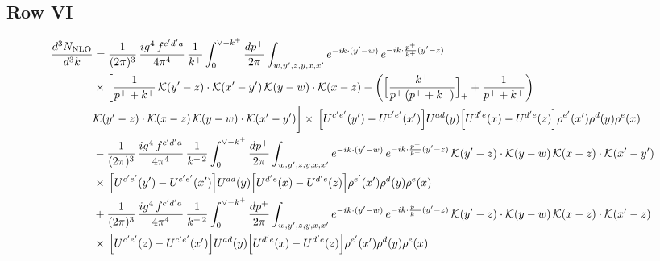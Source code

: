\documentclass[9pt]{article}
\numberwithin{equation}{section}
\begin{document}
\subsection{Row VI}
\begin{align}
\frac{d^{3}N_{\rm NLO}}{d^{3}k}&=\frac{1}{(2\pi)^{3}}\,\frac{ig^{4}\,f^{c^{\prime}d^{\prime}a}}{4\pi^{4}}\,\frac{1}{k^{+}}\int_{0}^{\vee-k^{+}}\frac{dp^{+}}{2\pi}\int_{w,y^{\prime},z,y,x,x^{\prime}}e^{-ik\cdot(y^{\prime}-w)}\,e^{-ik\cdot\frac{p^{+}}{k^{+}}(y^{\prime}-z)}\notag\\&\times\bigg[\frac{1}{p^{+}+k^{+}}\,\mathcal{K}(y^{\prime}-z)\cdot\mathcal{K}(x^{\prime}-y^{\prime})\,\mathcal{K}(y-w)\cdot\mathcal{K}(x-z)-\bigg(\Big[\frac{k^{+}}{p^{+}\,(p^{+}+k^{+})}\Big]_{+}+\frac{1}{p^{+}+k^{+}}\bigg)\notag \\ & \mathcal{K}(y^{\prime}-z)\cdot\mathcal{K}(x-z)\,\mathcal{K}(y-w)\cdot\mathcal{K}(x^{\prime}-y^{\prime})\bigg]\times\,\Big[U^{c^{\prime}e^{\prime}}(y^{\prime})-U^{c^{\prime}e^{\prime}}(x^{\prime})\Big]U^{ad}(y)\Big[U^{d^{\prime}e}(x)-U^{d^{\prime}e}(z)\Big]\rho^{e^{\prime}}(x^{\prime})\rho^{d}(y)\rho^{e}(x)\notag\\&-\frac{1}{(2\pi)^{3}}\,\frac{ig^{4}\,f^{c^{\prime}d^{\prime}a}}{4\pi^{4}}\,\frac{1}{k^{+\,2}}\int_{0}^{\vee-k^{+}}\frac{dp^{+}}{2\pi}\int_{w,y^{\prime},z,y,x,x^{\prime}}e^{-ik\cdot(y^{\prime}-w)}\,e^{-ik\cdot\frac{p^{+}}{k^{+}}(y^{\prime}-z)}\,\mathcal{K}(y^{\prime}-z)\cdot\mathcal{K}(y-w)\,\mathcal{K}(x-z)\cdot\mathcal{K}(x^{\prime}-y^{\prime})\notag\\&\times\,\Big[U^{c^{\prime}e^{\prime}}(y^{\prime})-U^{c^{\prime}e^{\prime}}(x^{\prime})\Big]U^{ad}(y)\Big[U^{d^{\prime}e}(x)-U^{d^{\prime}e}(z)\Big]\rho^{e^{\prime}}(x^{\prime})\rho^{d}(y)\rho^{e}(x)\notag\\&+\frac{1}{(2\pi)^{3}}\,\frac{ig^{4}\,f^{c^{\prime}d^{\prime}a}}{4\pi^{4}}\,\frac{1}{k^{+\,2}}\int_{0}^{\vee-k^{+}}\frac{dp^{+}}{2\pi}\int_{w,y^{\prime},z,y,x,x^{\prime}}e^{-ik\cdot(y^{\prime}-w)}\,e^{-ik\cdot\frac{p^{+}}{k^{+}}(y^{\prime}-z)}\,\mathcal{K}(y^{\prime}-z)\cdot\mathcal{K}(y-w)\,\mathcal{K}(x-z)\cdot\mathcal{K}(x^{\prime}-z)\notag\\&\times\,\Big[U^{c^{\prime}e^{\prime}}(z)-U^{c^{\prime}e^{\prime}}(x^{\prime})\Big]U^{ad}(y)\Big[U^{d^{\prime}e}(x)-U^{d^{\prime}e}(z)\Big]\rho^{e^{\prime}}(x^{\prime})\rho^{d}(y)\rho^{e}(x)
\end{align}
\end{document}
